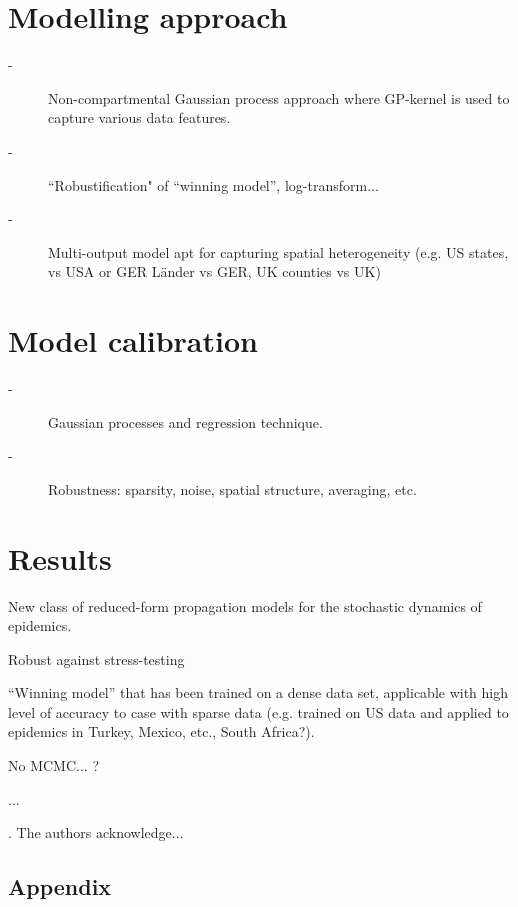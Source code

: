 \documentclass[11pt,a4paper,amssymb,amsmath, tightenlines]{article}
\numberwithin{equation}{section}
\begin{document}
\section{Modelling approach}
\begin{description}
\item[-] Non-compartmental Gaussian process approach where GP-kernel is used to capture various data features.
\item[-] ``Robustification" of ``winning model'', log-transform...
\item[-] Multi-output model apt for capturing spatial heterogeneity (e.g. US states, vs USA or GER L\"ander vs GER, UK counties vs UK) 
\end{description}
\section{Model calibration}
\begin{description}
	\item[-] Gaussian processes and regression technique.
	\item[-] Robustness: sparsity, noise, spatial structure, averaging, etc.
\end{description}
\section{Results}
\begin{description}
	\item[-] New class of reduced-form propagation models for the stochastic dynamics of epidemics.
	\item[-] Robust against stress-testing
	\item[-] ``Winning model'' that has been trained on a dense data set, applicable with high level of accuracy to case with sparse data (e.g. trained on US data and applied to epidemics in Turkey, Mexico, etc., South Africa?).
	\item[-] No MCMC... ?
	\item ... 
\end{description}
\vspace{0cm}
. The authors acknowledge...


\vspace{.5cm}
\begin{appendix}
\section{Appendix}
\end{appendix}
\end{document}
